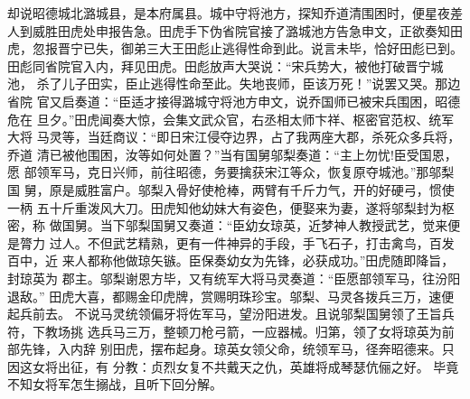 却说昭德城北潞城县，是本府属县。城中守将池方，探知乔道清围困时，便星夜差
人到威胜田虎处申报告急。田虎手下伪省院官接了潞城池方告急申文，正欲奏知田
虎，忽报晋宁已失，御弟三大王田彪止逃得性命到此。说言未毕，恰好田彪已到。
田彪同省院官入内，拜见田虎。田彪放声大哭说：“宋兵势大，被他打破晋宁城池，
杀了儿子田实，臣止逃得性命至此。失地丧师，臣该万死！”说罢又哭。那边省院
官又启奏道：“臣适才接得潞城守将池方申文，说乔国师已被宋兵围困，昭德危在
旦夕。”田虎闻奏大惊，会集文武众官，右丞相太师卞祥、枢密官范权、统军大将
马灵等，当廷商议：“即日宋江侵夺边界，占了我两座大郡，杀死众多兵将，乔道
清已被他围困，汝等如何处置？”当有国舅邬梨奏道：“主上勿忧!臣受国恩，愿
部领军马，克日兴师，前往昭德，务要擒获宋江等众，恢复原夺城池。”那邬梨国
舅，原是威胜富户。邬梨入骨好使枪棒，两臂有千斤力气，开的好硬弓，惯使一柄
五十斤重泼风大刀。田虎知他幼妹大有姿色，便娶来为妻，遂将邬梨封为枢密，称
做国舅。当下邬梨国舅又奏道：“臣幼女琼英，近梦神人教授武艺，觉来便是膂力
过人。不但武艺精熟，更有一件神异的手段，手飞石子，打击禽鸟，百发百中，近
来人都称他做琼矢镞。臣保奏幼女为先锋，必获成功。”田虎随即降旨，封琼英为
郡主。邬梨谢恩方毕，又有统军大将马灵奏道：“臣愿部领军马，往汾阳退敌。”
田虎大喜，都赐金印虎牌，赏赐明珠珍宝。邬梨、马灵各拨兵三万，速便起兵前去。
不说马灵统领偏牙将佐军马，望汾阳进发。且说邬梨国舅领了王旨兵符，下教场挑
选兵马三万，整顿刀枪弓箭，一应器械。归第，领了女将琼英为前部先锋，入内辞
别田虎，摆布起身。琼英女领父命，统领军马，径奔昭德来。只因这女将出征，有
分教：贞烈女复不共戴天之仇，英雄将成琴瑟伉俪之好。
毕竟不知女将军怎生搦战，且听下回分解。